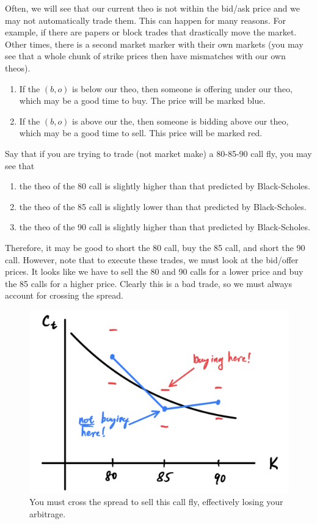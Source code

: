 \documentclass{article}
\begin{document}
    Often, we will see that our current theo is not within the bid/ask price and we may not automatically trade them. This can happen for many reasons. For example, if there are papers or block trades that drastically move the market. Other times, there is a second market marker with their own markets (you may see that a whole chunk of strike prices then have mismatches with our own theos). 
    \begin{enumerate}
      \item If the $(b, o)$ is below our theo, then someone is offering under our theo, which may be a good time to buy. The price will be marked blue. 
      \item If the $(b, o)$ is above our the, then someone is bidding above our theo, which may be a good time to sell. This price will be marked red. 
    \end{enumerate}

    \begin{example}
      Say that if you are trying to trade (not market make) a 80-85-90 call fly, you may see that 
      \begin{enumerate}
        \item the theo of the 80 call is slightly higher than that predicted by Black-Scholes. 
        \item the theo of the 85 call is slightly lower than that predicted by Black-Scholes. 
        \item the theo of the 90 call is slightly higher than that predicted by Black-Scholes. 
      \end{enumerate}
      Therefore, it may be good to short the 80 call, buy the 85 call, and short the 90 call. However, note that to execute these trades, we must look at the bid/offer prices. It looks like we have to sell the 80 and 90 calls for a lower price and buy the 85 calls for a higher price. Clearly this is a bad trade, so we must always account for crossing the spread. 

      \begin{figure}[H]
        \centering 
        \includegraphics[scale=0.4]{img/call_fly_cross_spread.png}
        \caption{You must cross the spread to sell this call fly, effectively losing your arbitrage. } 
        \label{fig:call_fly_cross_spread}
      \end{figure}
    \end{example}
\end{document}
